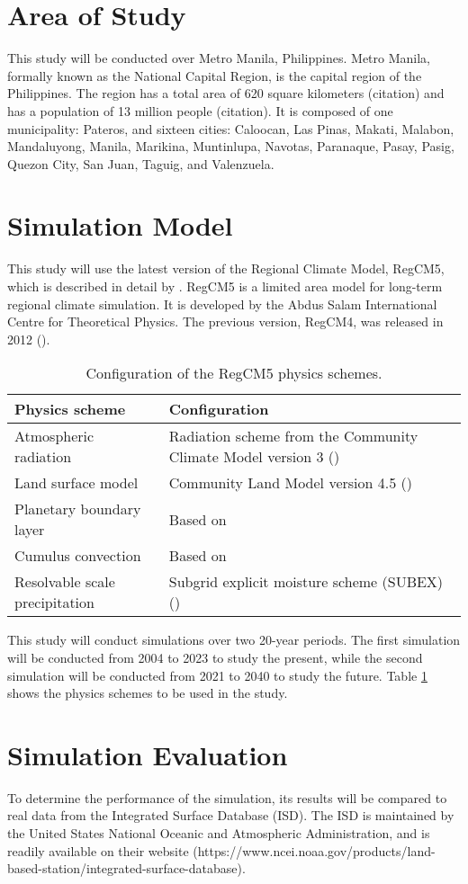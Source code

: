 \section{Area of Study}
	This study will be conducted over Metro Manila, Philippines.
	Metro Manila, formally known as the National Capital Region, is the capital region of the Philippines.
	The region has a total area of 620 square kilometers (citation)
		and has a population of 13 million people (citation).
	It is composed of one municipality: Pateros, and sixteen cities:
		Caloocan,
		Las Pinas,
		Makati,
		Malabon,
		Mandaluyong,
		Manila,
		Marikina,
		Muntinlupa,
		Navotas,
		Paranaque,
		Pasay,
		Pasig,
		Quezon City,
		San Juan,
		Taguig, and
		Valenzuela.
		
\section{Simulation Model}
	This study will use the latest version of the Regional Climate Model, RegCM5, which is described in detail by \textcite{Giorgi2023}.
	RegCM5 is a limited area model for long-term regional climate simulation.
	It is developed by the Abdus Salam International Centre for Theoretical Physics.
	The previous version, RegCM4, was released in 2012 (\cite{Giorgi2012}).
	
	\begin{table}	
		\caption{Configuration of the RegCM5 physics schemes.}
		\label{tab:physics-schemes}
		\centering
		\begin{tabular}{p{2 in} p{2.75 in}}
			\hline \hline
			Physics scheme & Configuration\\
			\hline
			Atmospheric radiation & Radiation scheme from the Community Climate Model version 3 (\cite{Kiehl1996}) \\
			Land surface model & Community Land Model version 4.5 (\cite{Oleson2013})\\
			Planetary boundary layer & Based on \textcite{Holtslag1990}\\
			Cumulus convection & Based on \textcite{Emanuel1991}\\
			Resolvable scale precipitation & Subgrid explicit moisture scheme (SUBEX) (\cite{Pal2000})\\
			\hline
		\end{tabular}		
	\end{table}

	This study will conduct simulations over two 20-year periods.
	The first simulation will be conducted from 2004 to 2023 to study the present,
		while the second simulation will be conducted from 2021 to 2040 to study the future.
	Table \ref{tab:physics-schemes} shows the physics schemes to be used in the study. 
	
\section{Simulation Evaluation}
	To determine the performance of the simulation, its results will be compared to real data from the Integrated Surface Database (ISD).
	The ISD is maintained by the United States National Oceanic and Atmospheric Administration, and is readily available on their website 
		(https://www.ncei.noaa.gov/products/land-based-station/integrated-surface-database).